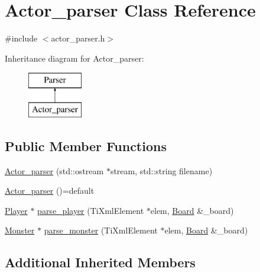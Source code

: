 \hypertarget{class_actor__parser}{\section{Actor\-\_\-parser Class Reference}
\label{class_actor__parser}
}


{\ttfamily \#include $<$actor\-\_\-parser.\-h$>$}

Inheritance diagram for Actor\-\_\-parser\-:\begin{figure}[H]
\begin{center}
\leavevmode
\includegraphics[height=2.000000cm]{class_actor__parser}
\end{center}
\end{figure}
\subsection*{Public Member Functions}
\begin{DoxyCompactItemize}
\item 
\hyperlink{class_actor__parser_ac313d2d8f57b99a7d207c1fe73d6dcdc}{Actor\-\_\-parser} (std\-::ostream $\ast$stream, std\-::string filename)
\item 
\hyperlink{class_actor__parser_a663d1598bbe15d136c86ac198d989eb0}{Actor\-\_\-parser} ()=default
\item 
\hyperlink{class_player}{Player} $\ast$ \hyperlink{class_actor__parser_aaefff797a5946c6f2fa2ddc1c860e6e8}{parse\-\_\-player} (Ti\-Xml\-Element $\ast$elem, \hyperlink{class_board}{Board} \&\-\_\-board)
\item 
\hyperlink{class_monster}{Monster} $\ast$ \hyperlink{class_actor__parser_a333b98bd35332c5ce8c420266b035a14}{parse\-\_\-monster} (Ti\-Xml\-Element $\ast$elem, \hyperlink{class_board}{Board} \&\-\_\-board)
\end{DoxyCompactItemize}
\subsection*{Additional Inherited Members}


